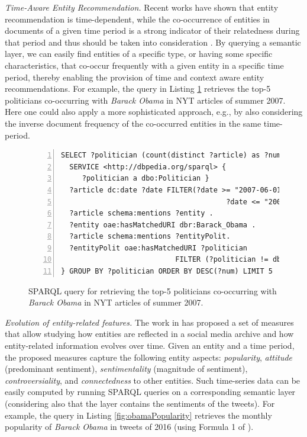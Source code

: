 \documentclass[twocolumn]{svjour3}
\begin{document}
{\em Time-Aware Entity Recommendation.}
Recent works have shown that entity recommendation is time-dependent,
while the co-occurrence of entities in documents of a given time period is
a strong indicator of their relatedness during that period and
thus should be taken into consideration \cite{zhang2016probabilistic,tran2017beyond}.
By querying a semantic layer,
we can easily find entities of a specific type, or having some specific characteristics,
that co-occur frequently with a given entity in a specific time period,
thereby enabling the provision of time and context aware entity recommendations.
For example, the query in Listing \ref{fig:queryCooccured} retrieves the top-5 politicians
co-occurring with {\em Barack Obama} in NYT articles of summer 2007.
Here one could also apply a more sophisticated approach, e.g., by also considering
the inverse document frequency of the co-occurred entities in the same time-period.

\begin{figure}[th]
\centering \scriptsize
\begin{Verbatim}[frame=lines,numbers=left,numbersep=1pt]
SELECT ?politician (count(distinct ?article) as ?num) WHERE {
  SERVICE <http://dbpedia.org/sparql> {
     ?politician a dbo:Politician }
  ?article dc:date ?date FILTER(?date >= "2007-06-01"^^xsd:date &&
                                       ?date <= "2007-08-30"^^xsd:date)  .
  ?article schema:mentions ?entity .
  ?entity oae:hasMatchedURI dbr:Barack_Obama .
  ?article schema:mentions ?entityPolit.
  ?entityPolit oae:hasMatchedURI ?politician
                           FILTER (?politician != dbr:Barack_Obama)
} GROUP BY ?politician ORDER BY DESC(?num) LIMIT 5
\end{Verbatim}
\vspace{-4mm}
\caption{SPARQL query for retrieving the top-5 politicians
co-occurring with {\em Barack Obama} in NYT articles of summer 2007.}
\label{fig:queryCooccured}
\end{figure}

\vspace{2mm} \noindent
{\em Evolution of entity-related features.}
The work in \cite{fafalios2017tpdl} has proposed a set of measures that
allow studying how entities are reflected in a social media archive and how
entity-related information evolves over time.
Given an entity and a time period, the proposed measures capture the following entity aspects:
{\em popularity},
{\em attitude} (predominant sentiment),
{\em sentimentality} (magnitude of sentiment),
{\em controversiality}, and
{\em connectedness} to other entities.
Such time-series data can be easily computed by running SPARQL queries
on a corresponding semantic layer (considering also that the layer contains the sentiments of the tweets).
For example, the query in Listing \ref{fig:obamaPopularity} retrieves
the monthly popularity  of {\em Barack Obama} in tweets of 2016 (using Formula 1 of \cite{fafalios2017tpdl}).
\end{document}
